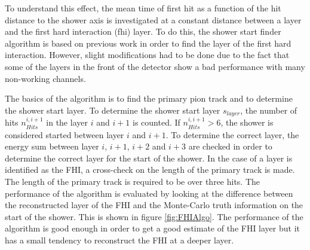 To understand this effect, the mean time of first hit as a function of the hit distance to the shower axis is investigated at a constant distance between a layer and the first hard interaction (\acrshort{fhi}) layer. To do this, the shower start finder algorithm is based on previous work \cite{CaN026} in order to find the layer of the first hard interaction. However, slight modifications had to be done due to the fact that some of the layers in the front of the detector show a bad performance with many non-working channels.

The basics of the algorithm is to find the primary pion track and to determine the shower start layer. To determine the shower start layer $s_{layer}$, the number of hits $n_{Hits}^{i, i+1}$ in the layer $i$ and $i+1$ is counted. If $n_{Hits}^{i, i+1} > 6$, the shower is considered started between layer $i$ and $i+1$. To determine the correct layer, the energy sum between layer $i$, $i+1$, $i+2$ and $i+3$ are checked in order to determine the correct layer for the start of the shower. In the case of a layer is identified as the FHI, a cross-check on the length of the primary track is made. The length of the primary track is required to be over three hits. The performance of the algorithm is evaluated by looking at the difference between the reconstructed layer of the FHI and the Monte-Carlo truth information on the start of the shower. This is shown in figure \ref{fig:FHIAlgo}. The performance of the algorithm is good enough in order to get a good estimate of the FHI layer but it has a small tendency to reconstruct the FHI at a deeper layer.

